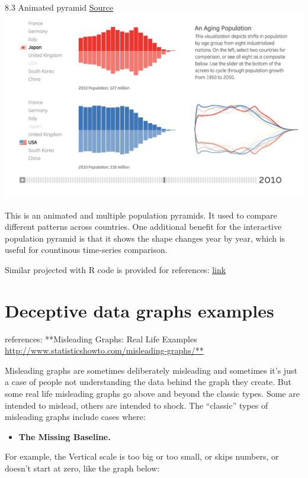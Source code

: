 \documentclass[]{book}
\providecommand{\tightlist}{%
  \setlength{\itemsep}{0pt}\setlength{\parskip}{0pt}}
\theoremstyle{definition}
\theoremstyle{definition}
\theoremstyle{definition}
\theoremstyle{remark}
\begin{document}
8.3 Animated pyramid \href{https://fathom.info/aging/}{Source}
\includegraphics{images/3_1.png}

This is an animated and multiple population pyramids. It used to compare
different patterns across countries. One additional benefit for the
interactive population pyramid is that it shows the shape changes year
by year, which is useful for countinous time-series comparison.

Similar projected with R code is provided for references:
\href{https://www.r-bloggers.com/who-is-old-visualizing-the-concept-of-prospective-ageing-with-animated-population-pyramids/}{link}

\section{Deceptive data graphs
examples}\label{deceptive-data-graphs-examples}

references: **Misleading Graphs: Real Life Examples
\url{http://www.statisticshowto.com/misleading-graphs/**}

Misleading graphs are sometimes deliberately misleading and sometimes
it's just a case of people not understanding the data behind the graph
they create. But some real life misleading graphs go above and beyond
the classic types. Some are intended to mislead, others are intended to
shock. The ``classic'' types of misleading graphs include cases where:

\begin{itemize}
\tightlist
\item
  \textbf{The Missing Baseline.}
\end{itemize}

For example, the Vertical scale is too big or too small, or skips
numbers, or doesn't start at zero, like the graph below:
\end{document}

